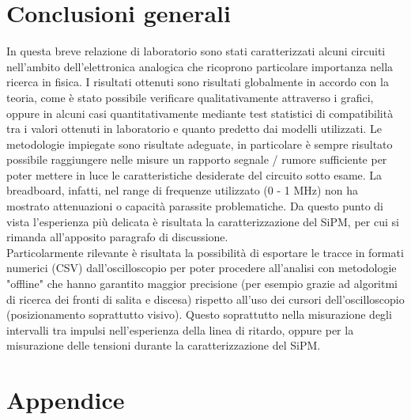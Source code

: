 \documentclass[journal]{IEEEtran}
\begin{document}
\clearpage
\section{Conclusioni generali} %
In questa breve relazione di laboratorio sono stati caratterizzati alcuni circuiti nell'ambito dell'elettronica analogica che ricoprono particolare importanza nella ricerca in fisica. I risultati ottenuti sono risultati globalmente in accordo con la teoria, come è stato possibile verificare qualitativamente attraverso i grafici, oppure in alcuni casi quantitativamente mediante test statistici di compatibilità tra i valori ottenuti in laboratorio e quanto predetto dai modelli utilizzati. Le metodologie impiegate sono risultate adeguate, in particolare è sempre risultato possibile raggiungere nelle misure un rapporto segnale / rumore sufficiente per poter mettere in luce le caratteristiche desiderate del circuito sotto esame. La breadboard, infatti, nel range di frequenze utilizzato (0 - 1 MHz) non ha mostrato attenuazioni o capacità parassite problematiche. Da questo punto di vista l'esperienza più delicata è risultata la caratterizzazione del SiPM, per cui si rimanda all'apposito paragrafo di discussione. \\

Particolarmente rilevante è risultata la possibilità di esportare le tracce in formati numerici (CSV) dall'oscilloscopio per poter procedere all'analisi con metodologie "offline" che hanno garantito maggior precisione (per esempio grazie ad algoritmi di ricerca dei fronti di salita e discesa) rispetto all'uso dei cursori dell'oscilloscopio (posizionamento soprattutto visivo). Questo soprattutto nella misurazione degli intervalli tra impulsi nell'esperienza della linea di ritardo, oppure per la misurazione delle tensioni durante la caratterizzazione del SiPM.

\section{Appendice}
\end{document}
